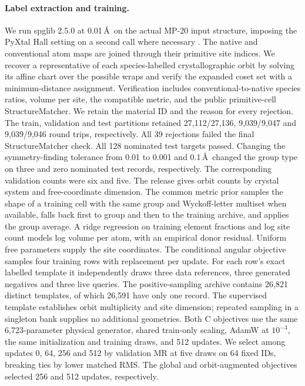 \paragraph{Label extraction and training.}
We run spglib 2.5.0 at 0.01\,\AA\ on the actual MP-20 input structure, imposing the PyXtal Hall setting on a second call where necessary \cite{spglib}. The native and conventional atom maps are joined through their primitive site indices. We recover a representative of each species-labelled crystallographic orbit by solving its affine chart over the possible wraps and verify the expanded coset set with a minimum-distance assignment. Verification includes conventional-to-native species ratios, volume per site, the compatible metric, and the public primitive-cell StructureMatcher. We retain the material ID and the reason for every rejection.
The train, validation and test partitions retained 27,112/27,136, 9,039/9,047 and 9,039/9,046 round trips, respectively. All 39 rejections failed the final StructureMatcher check. All 128 nominated test targets passed. Changing the symmetry-finding tolerance from 0.01 to 0.001 and 0.1\,\AA\ changed the group type on three and zero nominated test records, respectively. The corresponding validation counts were six and five. The release gives orbit counts by crystal system and free-coordinate dimension.
The common metric prior samples the shape of a training cell with the same group and Wyckoff-letter multiset when available, falls back first to group and then to the training archive, and applies the group average. A ridge regression on training element fractions and log site count models log volume per atom, with an empirical donor residual. Uniform free parameters supply the site coordinates. The conditional angular objective samples four training rows with replacement per update. For each row's exact labelled template it independently draws three data references, three generated negatives and three live queries. The positive-sampling archive contains 26,821 distinct templates, of which 26,591 have only one record. The supervised template establishes orbit multiplicity and site dimension; repeated sampling in a singleton bank supplies no additional geometries. Both C objectives use the same 6,723-parameter physical generator, shared train-only scaling, AdamW at $10^{-3}$, the same initialization and training draws, and 512 updates. We select among updates 0, 64, 256 and 512 by validation MR at five draws on 64 fixed IDs, breaking ties by lower matched RMS. The global and orbit-augmented objectives selected 256 and 512 updates, respectively.

